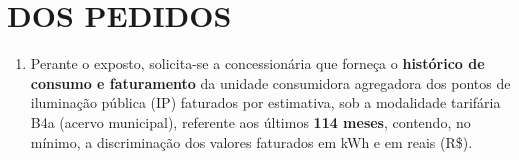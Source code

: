 \section{DOS PEDIDOS}

\begin{enumerate}[resume]
\item 
Perante o exposto, solicita-se a concessionária que forneça o \textbf{histórico de consumo e faturamento} da unidade consumidora agregadora dos pontos de iluminação pública (IP) faturados por estimativa, sob a modalidade tarifária B4a (acervo municipal), referente aos últimos \textbf{114 meses}, contendo, no mínimo, a discriminação dos valores faturados em kWh e em reais (R\$).
\end{enumerate}
